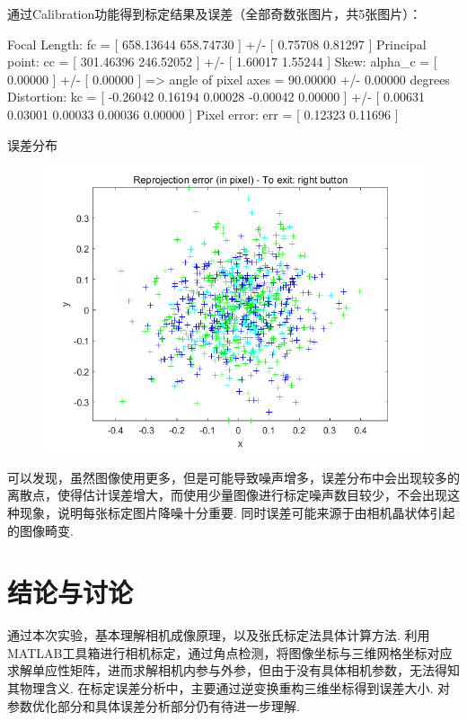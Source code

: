 \documentclass[12pt, a4paper, oneside]{ctexart}
\numberwithin{equation}{section}  %
\begin{document}
通过Calibration功能得到标定结果及误差（全部奇数张图片，共5张图片）：
\begin{matlabcode}
Focal Length: fc = [ 658.13644   658.74730 ] +/- [ 0.75708   0.81297 ]
Principal point: cc = [ 301.46396   246.52052 ] +/- [ 1.60017   1.55244 ]
Skew: alpha_c = [ 0.00000 ] +/- [ 0.00000  ]   => angle of pixel axes = 90.00000 +/- 0.00000 degrees
Distortion: kc = [ -0.26042   0.16194   0.00028   -0.00042  0.00000 ] +/- [ 0.00631   0.03001   0.00033   0.00036  0.00000 ]
Pixel error: err = [ 0.12323   0.11696 ]
\end{matlabcode}
误差分布
\begin{figure}[htbp]
    \centering
    \includegraphics[scale=0.5]{error1.png}
\end{figure}

可以发现，虽然图像使用更多，但是可能导致噪声增多，误差分布中会出现较多的离散点，使得估计误差增大，而使用少量图像进行标定噪声数目较少，不会出现这种现象，说明每张标定图片降噪十分重要. 同时误差可能来源于由相机晶状体引起的图像畸变.


\section{结论与讨论}
通过本次实验，基本理解相机成像原理，以及张氏标定法具体计算方法. 利用MATLAB工具箱进行相机标定，通过角点检测，将图像坐标与三维网格坐标对应求解单应性矩阵，进而求解相机内参与外参，但由于没有具体相机参数，无法得知其物理含义. 在标定误差分析中，主要通过逆变换重构三维坐标得到误差大小. 对参数优化部分和具体误差分析部分仍有待进一步理解.
\end{document}
